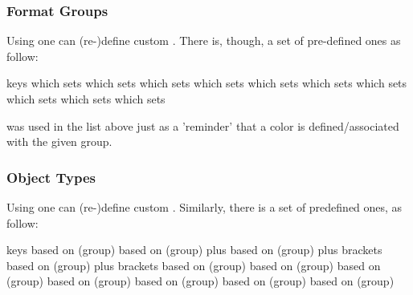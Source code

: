 \documentclass{article}
\begin{document}
\subsubsection{Format Groups}
Using  one can (re-)define custom . There is, though, a set of pre-defined  ones as follow:

\begin{describelist*}{keys}
   {which sets }
   {which sets }
   {which sets }
   {which sets }
   {which sets }
   {which sets }
   {which sets }
   {which sets }
    {which sets }
    {which sets }
\end{describelist*}
\begin{tsremark}
 was used in the list above just as a 'reminder' that a color is defined/associated with the given group.
\end{tsremark}

\subsubsection{Object Types}
Using  one can (re-)define custom .
Similarly, there is a set of predefined ones, as follow:

\begin{describelist*}{keys}
   {based on (group) }
   {based on (group)  plus }
   {based on (group)  plus brackets}
   {based on (group)  plus brackets}
   {based on (group) }
   {based on (group) }
   {based on (group) }
   {based on (group) }
   {based on (group) }
    {based on (group) }
    {based on (group) }
\end{describelist*}
\end{document}
